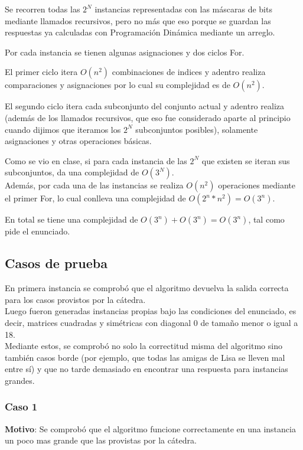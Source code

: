 Se recorren todas las $2^N$ instancias representadas con las máscaras de bits
mediante llamados recursivos, pero no más que eso porque se guardan las
respuestas ya calculadas con Programación Dinámica mediante un arreglo.

Por cada instancia se tienen algunas asignaciones y dos ciclos For.

El primer ciclo itera $O(n^2)$ combinaciones de indices y adentro realiza
comparaciones y asignaciones por lo cual su complejidad es de $O(n^2)$.

El segundo ciclo itera cada subconjunto del conjunto actual y adentro realiza
(además de los llamados recursivos, que eso fue considerado aparte al principio
cuando dijimos que iteramos los $2^N$ subconjuntos posibles), solamente
asignaciones y otras operaciones básicas.

Como se vio en clase, si para cada instancia de las $2^N$ que existen se iteran
sus subconjuntos, da una complejidad de $O(3^N)$.\\ Además, por cada una de
las instancias se realiza $O(n^2)$ operaciones mediante el primer For, lo cual
conlleva una complejidad de $O(2^n * n^2) = O(3^n)$.

En total se tiene una complejidad de $O(3^n) + O(3^n) = O(3^n)$, tal como pide
el enunciado.

\subsection{Casos de prueba}

En primera instancia se comprobó que el algoritmo devuelva la salida correcta para los casos provistos por la cátedra. \\
Luego fueron generadas instancias propias bajo las condiciones del enunciado, es decir, matrices cuadradas y simétricas con diagonal 0 de tamaño menor o igual a 18. \\
Mediante estos, se comprobó no solo la correctitud misma del algoritmo sino también casos borde
(por ejemplo, que todas las amigas de Lisa se lleven mal entre sí)
y que no tarde demasiado en encontrar una respuesta para instancias grandes.


\subsubsection*{Caso 1}

\textbf{Motivo}: Se comprobó que el algoritmo funcione correctamente en una instancia un poco mas grande que las provistas por la cátedra. \\

